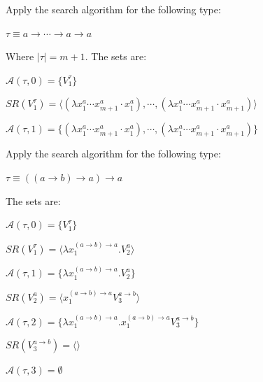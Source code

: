 \documentclass[a4paper,10pt]{article}
\begin{document}
\begin{exa}
       Apply the search algorithm for the following type:
     \begin{center}
           $\tau \equiv a \to \cdots \to a \to a$
     \end{center}

     Where $|\tau| = m+1$. The sets are:
     \begin{center}
          $\mathcal{A}(\tau,0) = \{ V^{\tau}_1\}$
     \end{center}

     \begin{center}
          $SR(V^{\tau}_1) = \langle (\lambda x^{a}_1 \cdots
          x^{a}_{m+1} \cdot x^{a}_1), \cdots, (\lambda x^{a}_1 \cdots
          x^{a}_{m+1} \cdot x^{a}_{m+1}) \rangle$
     \end{center}

     \begin{center}
              $\mathcal{A}(\tau,1) = \{ (\lambda x^{a}_1 \cdots
          x^{a}_{m+1} \cdot x^{a}_1), \cdots, (\lambda x^{a}_1 \cdots
          x^{a}_{m+1} \cdot x^{a}_{m+1}) \}$
     \end{center}
\end{exa}

\begin{exa}
  Apply the search algorithm for the following type:
     \begin{center}
           $\tau \equiv ((a \to b) \to a) \to a$
     \end{center}

     The sets are:
     \begin{center}
          $\mathcal{A}(\tau,0) = \{ V^{\tau}_1\}$
     \end{center}

     \begin{center}
            $SR(V^{\tau}_1 ) = \langle \lambda x^{(a \to b) \to a}_1. V^{a}_2 \rangle$
     \end{center}

     \begin{center}
            $\mathcal{A}(\tau,1) = \{ \lambda x^{(a \to b) \to a}_1. V^{a}_2 \}$
     \end{center}

     \begin{center}
            $SR(V^{a}_2  ) = \langle x^{(a \to b) \to a}_1 V^{a \to b}_3 \rangle$
     \end{center}

     \begin{center}
            $\mathcal{A}(\tau,2) = \{ \lambda x^{(a \to b) \to
              a}_1. x^{(a \to b) \to a}_1 V^{a \to b}_3 \}$
     \end{center}

     \begin{center}
            $SR(V^{a \to b}_3  ) = \langle \rangle$
     \end{center}

     \begin{center}
            $\mathcal{A}(\tau,3) = \emptyset$
     \end{center}
\end{exa}
\end{document}
